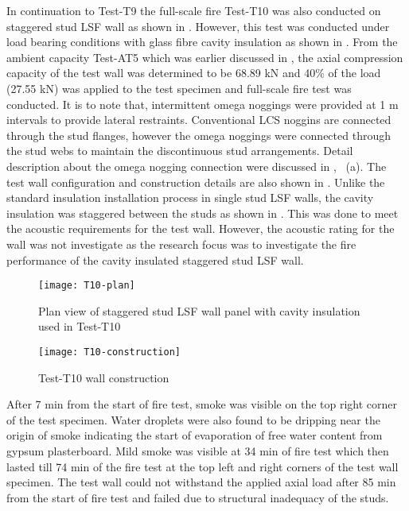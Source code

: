 In continuation to Test-T9 the full-scale fire Test-T10 was also conducted on staggered stud LSF wall as shown in . However, this test was conducted under load bearing conditions with glass fibre cavity insulation as shown in . From the ambient capacity Test-AT5 which was earlier discussed in , the axial compression capacity of the test wall was determined to be 68.89 kN and 40\% of the load (27.55 kN) was applied to the test specimen and full-scale fire test was conducted. It is to note that, intermittent omega noggings were provided at 1 m intervals to provide lateral restraints. Conventional LCS noggins are connected through the stud flanges, however the omega noggings were connected through the stud webs to maintain the discontinuous stud arrangements. Detail description about the omega nogging connection were discussed in , ~(a). The test wall configuration and construction details are also shown in . Unlike the standard insulation installation process in single stud LSF walls, the cavity insulation was staggered between the studs as shown in . This was done to meet the acoustic requirements for the test wall. However, the acoustic rating for the wall was not investigate as the research focus was to investigate the fire performance of the cavity insulated staggered stud LSF wall. 
\begin{figure}[!htbp]
	\centering
		\texttt{[image: T10-plan]}
		\caption{Plan view of staggered stud LSF wall panel with cavity insulation used in Test-T10}
		\label{fig:T10-plan}
\end{figure}
\begin{figure}[!htbp]
	\centering
		\texttt{[image: T10-construction]}
		\caption{Test-T10 wall construction}
		\label{fig:T10-construction}
\end{figure}

After 7 min from the start of fire test, smoke was visible on the top right corner of the test specimen. Water droplets were also found to be dripping near the origin of smoke indicating the start of evaporation of free water content from gypsum plasterboard. Mild smoke was visible at 34 min of fire test which then lasted till 74 min of the fire test at the top left and right corners of the test wall specimen. The test wall could not withstand the applied axial load after 85 min from the start of fire test and failed due to structural inadequacy of the studs. 

